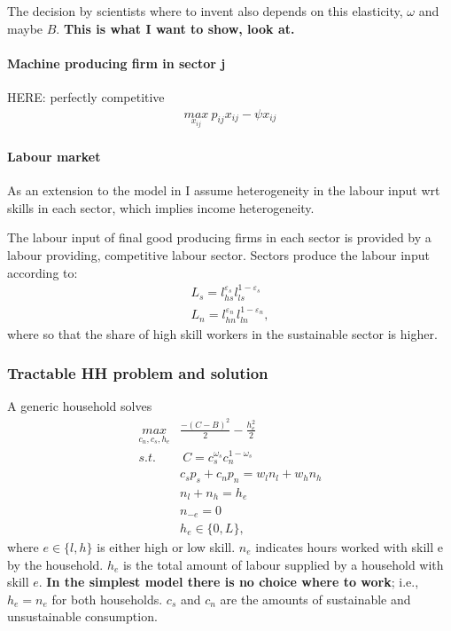 The decision by scientists where to invent also depends on this elasticity, $\omega$ and maybe $B$. \textbf{This is what I want to show, look at.}

\paragraph{Machine producing firm in sector j}
HERE: perfectly competitive
\begin{align*}
\underset{x_{ij}}{max}\  p_{ij}x_{ij}-\psi x_{ij}
\end{align*}

\paragraph{Labour market}
As an extension to the model in \cite{Acemoglu2012TheChange} I assume heterogeneity in the labour input wrt skills in each sector, which implies income heterogeneity. 
\begin{comment}
\begin{align*}
H_s= \lambda z_h l_r\\
H_n= (1-\lambda) z_l l_p
\end{align*}
\ar could have that in the initial ss wages in the low sector are higher since less labour is available with $z_l<z_h$. Either allow rich also to work there... or drop $z_h, z_l$. For now, drop $z_h, z_l$ and see what comes out from the simple setup, then think about how to adjust it if need be/ to make it more realistic.

\end{comment}
The labour input of final good producing firms in each sector is provided by a labour providing, competitive labour sector. Sectors produce the labour input according to: 
\begin{align*}
L_s= l_{hs}^{\varepsilon_s}l_{ls}^{1-\varepsilon_s}\\
L_n=l_{hn}^{\varepsilon_n}l_{ln}^{1-\varepsilon_n},
\end{align*}
where  so that the share of high skill workers in the sustainable sector is higher.

\subsubsection{Tractable HH problem and solution}
A generic household solves
\begin{align*}
\underset{c_n, c_s, h_e}{max}& \frac{-(C-B)^2}{2}- \frac{h_e^2}{2}\\
s.t.& \ C= c_s^{\omega_s} c_n^{1-\omega_s}\\
& c_sp_s+c_np_n=w_ln_l+w_hn_h\\
& n_l+n_h=h_e\\
& n_{-e}=0\\
& h_e\in\{0,L\},
\end{align*}
where $e\in\{l,h\}$ is either high or low skill. $n_e$ indicates hours worked with skill e by the household. $h_e$  is the total amount of labour supplied by a household with skill $e$. 
\textbf{In the simplest model there is no choice where to work}; i.e., $h_e=n_e$ for both households.
$c_s$ and $c_n$ are the amounts of sustainable and unsustainable consumption. 

